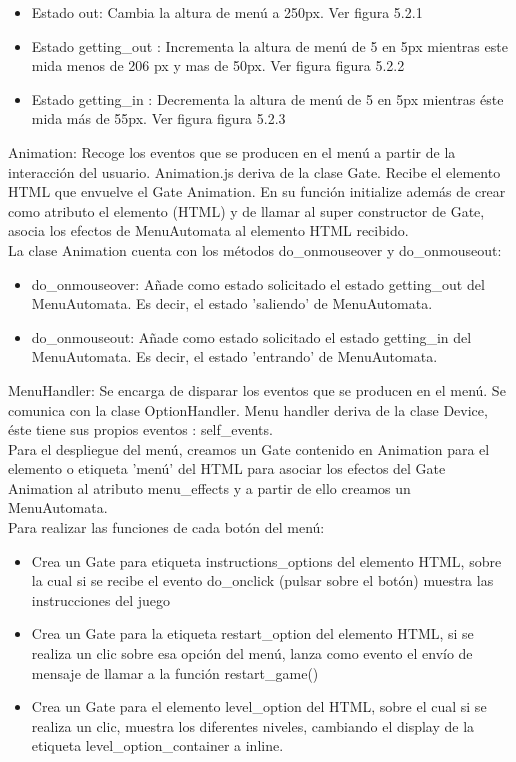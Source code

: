 \begin{itemize}
 \item Estado out: Cambia la altura de menú a 250px. Ver figura 5.2.1

 \item Estado getting\_out : Incrementa la altura de menú de 5 en 5px  mientras este mida menos de 206 px y mas de 50px. Ver figura figura 5.2.2

 \item Estado getting\_in : Decrementa la altura de menú de 5 en 5px  mientras éste mida  más de 55px. Ver figura figura 5.2.3
\end{itemize}

        
Animation: Recoge los eventos que se producen en el menú a partir de la interacción del usuario. Animation.js deriva de la clase Gate.
Recibe el elemento HTML que envuelve  el Gate Animation. En su función initialize además de crear como atributo  el elemento (HTML) y de llamar
al super constructor de Gate, asocia los efectos de MenuAutomata al elemento HTML recibido.\\

La clase Animation cuenta con los métodos do\_onmouseover y do\_onmouseout:
\begin{itemize}
 \item do\_onmouseover: Añade como estado solicitado el estado getting\_out del MenuAutomata.
Es decir, el estado 'saliendo' de MenuAutomata.

 \item do\_onmouseout: Añade como estado solicitado el estado getting\_in del MenuAutomata.
Es decir, el estado 'entrando' de MenuAutomata.
\end{itemize}

MenuHandler: Se encarga de disparar los eventos que se producen en el menú. Se comunica con la clase OptionHandler.
Menu handler deriva de la clase Device, éste  tiene sus propios eventos : self\_events.\\

Para el despliegue del menú, creamos un Gate contenido en Animation para el elemento o etiqueta 'menú' del HTML para asociar los efectos del 
Gate Animation al atributo menu\_effects y a partir de ello creamos un MenuAutomata.\\

Para realizar las funciones de cada botón del menú:
\begin{itemize}
 \item Crea un Gate  para etiqueta instructions\_options del elemento HTML, sobre la cual si se recibe el 
evento do\_onclick (pulsar sobre el botón) muestra las instrucciones del juego

 \item Crea un Gate para la etiqueta restart\_option del elemento HTML, si se realiza un clic sobre esa opción del menú, lanza como evento el envío 
de mensaje de llamar a la función restart\_game()

 \item Crea un Gate para el elemento level\_option del HTML, sobre el cual si se realiza un clic,
muestra los diferentes niveles, cambiando el display de la etiqueta level\_option\_container a inline.
\end{itemize}

